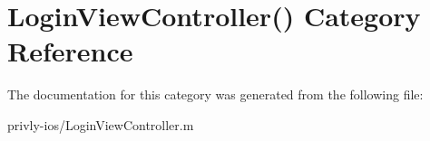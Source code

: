 \hypertarget{category_login_view_controller_07_08}{\section{Login\-View\-Controller() Category Reference}
\label{category_login_view_controller_07_08}
}


The documentation for this category was generated from the following file\-:\begin{DoxyCompactItemize}
\item 
privly-\/ios/Login\-View\-Controller.\-m\end{DoxyCompactItemize}
